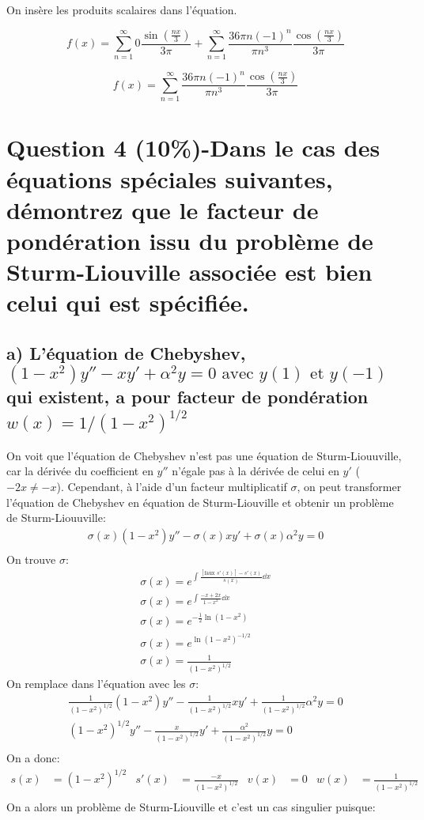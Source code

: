 \documentclass{article}
\begin{document}
On insère les produits scalaires dans l'équation.

$$f(x) = \sum_{n=1}^{\infty}0\frac{\sin(\frac{nx}{3})}{ 3 \pi}  + \sum_{n=1}^{\infty}\frac{ 36 \pi n (-1)^{n}} {\pi n^3}\frac{\cos(\frac{nx}{3})}{ 3 \pi} $$

$$f(x) =  \sum_{n=1}^{\infty}\frac{ 36 \pi n (-1)^{n}} {\pi n^3}\frac{\cos(\frac{nx}{3})}{ 3 \pi} $$






\section*{Question 4 (10\%)-Dans le cas des équations spéciales suivantes, démontrez que le facteur de
pondération issu du problème de Sturm-Liouville associée est bien celui qui est spécifiée.}
\subsection*{a) L’équation de Chebyshev, $(1-x^2) y'' -x y' +\alpha^2
y = 0 \text{ avec } y(1) \text{ et } y(-1)$ qui existent, a pour facteur de pondération $w(x) = 1/(1-x^2)^{1/2}$}



On voit que l'équation de Chebyshev n'est pas une équation de Sturm-Liouuville, car la dérivée du coefficient en $y''$ n'égale pas à la dérivée de celui en $y'$ ($-2x\neq-x$). Cependant, à l'aide d'un facteur multiplicatif $\sigma$, on peut transformer l'équation de Chebyshev en équation de Sturm-Liouville et obtenir un problème de Sturm-Liouuville:
\begin{gather*}
    \sigma(x)(1-x^2) y'' -\sigma(x)x y' +\sigma(x)\alpha^2y = 0\\
\end{gather*}
On trouve $\sigma$:
\begin{gather*}
    \sigma(x) = e^{\int\frac{[\text{faux }s'(x)]-s'(x)}{s(x)}\dd{x}}\\
    \sigma(x) = e^{\int\frac{-x+2x}{1-x^2}\dd{x}}\\
    \sigma(x) = e^{-\frac{1}{2}\ln(1-x^2)}\\
    \sigma(x) = e^{\ln(1-x^2)^{-1/2}}\\
    \sigma(x) = \frac{1}{(1-x^2)^{1/2}}
\end{gather*}
On remplace dans l'équation avec les $\sigma$:
\begin{gather*}
    \frac{1}{(1-x^2)^{1/2}}(1-x^2) y'' -\frac{1}{(1-x^2)^{1/2}}x y' +\frac{1}{(1-x^2)^{1/2}}\alpha^2y = 0\\
   (1-x^2)^{1/2} y'' -\frac{x}{(1-x^2)^{1/2}} y' +\frac{\alpha^2}{(1-x^2)^{1/2}}y = 0\\
\end{gather*}
On a donc:
\begin{align*}
    s(x)&=(1-x^2)^{1/2}&s'(x)&=\frac{-x}{(1-x^2)^{1/2}}& v(x)&=0 & w(x)&=\frac{1}{(1-x^2)^{1/2}}\\
\end{align*}
On a alors un problème de Sturm-Liouville et c'est un cas singulier puisque:\\
\end{document}
